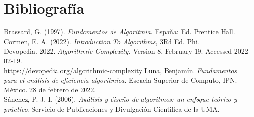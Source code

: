 \documentclass[12pt,twoside]{article}
\begin{document}
\section{Bibliograf\'ia}

Brassard, G. (1997). \textit {Fundamentos de Algoritmia}. España: Ed. Prentice Hall.\\[0.4cm]
Cormen, E. A. (2022). \textit{Introduction To Algorithms}, 3Rd Ed. Phi.\\[0.4cm]
Devopedia. 2022. \textit{Algorithmic Complexity.} Version 8, February 19. Accessed 2022-02-19.\\[0.4cm] https://devopedia.org/algorithmic-complexity
Luna, Benjam\'in. \textit{Fundamentos para el an\'alisis de eficiencia algor\'itmica}. Escuela Superior de Computo, IPN. M\'exico. 28 de febrero de 2022.\\[0.4cm]
S\'anchez, P. J. I. (2006). \textit{Análisis y diseño de algoritmos: un enfoque teórico y práctico}. Servicio de Publicaciones y Divulgación Científica de la UMA.


\medskip
\end{document}
